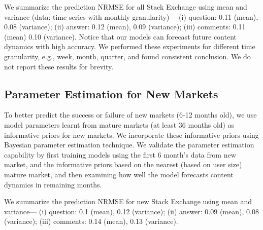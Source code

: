 We summarize the prediction NRMSE for all Stack Exchange using mean and variance (data: time series with monthly granularity)--- (i) question: 0.11 (mean), 0.08 (variance); (ii) answer: 0.12 (mean), 0.09 (variance); (iii) comments: 0.11 (mean) 0.10 (variance). Notice that our models can forecast future content dynamics with high accuracy. We performed these experiments for different time granularity, e.g., week, month, quarter, and found consistent conclusion. We do not report these results for brevity.

\subsection{Parameter Estimation for New Markets} 
To better predict the success or failure of new markets (6-12 months old), we use model parameters learnt from mature markets (at least 36 months old) as informative priors for new markets. We incorporate these informative priors using Bayesian parameter estimation technique. We validate the parameter estimation capability by first training models using the first 6 month's data from new market, and the informative priors based on the nearest (based on user size) mature market, and then examining how well the model forecasts content dynamics in remaining months. 

We summarize the prediction NRMSE for new Stack Exchange using mean and variance--- (i) question: 0.1 (mean), 0.12 (variance); (ii) answer: 0.09 (mean), 0.08 (variance); (iii) comments: 0.14 (mean), 0.13 (variance).

